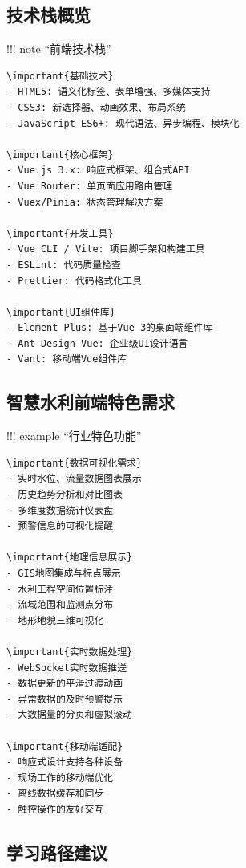 \hypertarget{ux6280ux672fux6808ux6982ux89c8}{%
\subsection{技术栈概览}\label{ux6280ux672fux6808ux6982ux89c8}}

!!! note ``前端技术栈''

\begin{verbatim}
\important{基础技术}
- HTML5: 语义化标签、表单增强、多媒体支持
- CSS3: 新选择器、动画效果、布局系统
- JavaScript ES6+: 现代语法、异步编程、模块化

\important{核心框架}
- Vue.js 3.x: 响应式框架、组合式API
- Vue Router: 单页面应用路由管理
- Vuex/Pinia: 状态管理解决方案

\important{开发工具}
- Vue CLI / Vite: 项目脚手架和构建工具
- ESLint: 代码质量检查
- Prettier: 代码格式化工具

\important{UI组件库}
- Element Plus: 基于Vue 3的桌面端组件库
- Ant Design Vue: 企业级UI设计语言
- Vant: 移动端Vue组件库
\end{verbatim}

\hypertarget{ux667aux6167ux6c34ux5229ux524dux7aefux7279ux8272ux9700ux6c42}{%
\subsection{智慧水利前端特色需求}\label{ux667aux6167ux6c34ux5229ux524dux7aefux7279ux8272ux9700ux6c42}}

!!! example ``行业特色功能''

\begin{verbatim}
\important{数据可视化需求}
- 实时水位、流量数据图表展示
- 历史趋势分析和对比图表
- 多维度数据统计仪表盘
- 预警信息的可视化提醒

\important{地理信息展示}
- GIS地图集成与标点展示
- 水利工程空间位置标注
- 流域范围和监测点分布
- 地形地貌三维可视化

\important{实时数据处理}
- WebSocket实时数据推送
- 数据更新的平滑过渡动画
- 异常数据的及时预警提示
- 大数据量的分页和虚拟滚动

\important{移动端适配}
- 响应式设计支持各种设备
- 现场工作的移动端优化
- 离线数据缓存和同步
- 触控操作的友好交互
\end{verbatim}

\hypertarget{ux5b66ux4e60ux8defux5f84ux5efaux8bae}{%
\subsection{学习路径建议}\label{ux5b66ux4e60ux8defux5f84ux5efaux8bae}}

